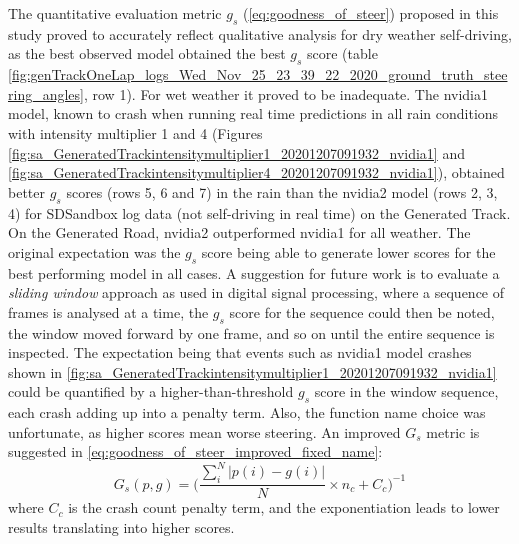 The quantitative evaluation metric $g_s$ (\ref{eq:goodness_of_steer}) proposed in this study proved to accurately reflect qualitative analysis for dry weather self-driving, as the best observed model obtained the best $g_s$ score (table  \ref{fig:genTrackOneLap_logs_Wed_Nov_25_23_39_22_2020_ground_truth_steering_angles}, row 1). For wet weather it proved to be inadequate. 
The nvidia1 model, known to crash when running real time predictions in all rain conditions with intensity multiplier 1 and 4 (Figures
\ref{fig:sa_GeneratedTrackintensitymultiplier1_20201207091932_nvidia1} and  \ref{fig:sa_GeneratedTrackintensitymultiplier4_20201207091932_nvidia1}), obtained better $g_s$ scores (rows 5, 6 and 7) in the rain than the nvidia2 model (rows 2, 3, 4) for SDSandbox log data (not self-driving in real time) on the Generated Track. On the Generated Road, nvidia2 outperformed nvidia1 for all weather. The original expectation was the $g_s$ score being able to generate lower scores for the best performing model in all cases. A suggestion for future work is to evaluate a \textit{sliding window} approach as used in digital signal processing, where a sequence of frames is analysed at a time, the $g_s$ score for the sequence could then be noted, the window moved forward by one frame, and so on until the entire sequence is inspected. The expectation being that events such as nvidia1 model crashes shown in \ref{fig:sa_GeneratedTrackintensitymultiplier1_20201207091932_nvidia1} could be quantified by a higher-than-threshold $g_s$ score in the window sequence, each crash adding up into a penalty term. Also, the function name choice was unfortunate, as higher scores mean worse steering. An improved $G_s$ metric is suggested in \ref{eq:goodness_of_steer_improved_fixed_name}:
\begin{equation}
    \label{eq:goodness_of_steer_improved_fixed_name}
    G_s(p,g) = \Bigg(\frac{\sum_i^N \lvert p(i)-g(i) \rvert }{N} \times n_c + C_c\Bigg)^{-1}
\end{equation}
where $C_c$ is the crash count penalty term, and the exponentiation leads to lower results translating into higher scores.


